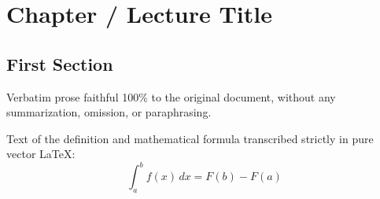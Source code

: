 \documentclass[../main.tex]{subfiles}
\begin{document}

\chapter{Chapter / Lecture Title}

\section{First Section}
Verbatim prose faithful 100\% to the original document, without any summarization, omission, or paraphrasing.

\begin{defbox}[Definition 1.1.]
Text of the definition and mathematical formula transcribed strictly in pure vector LaTeX:
\begin{equation}
\int_a^b f(x)\,dx = F(b) - F(a)
\end{equation}
\end{defbox}

\end{document}

